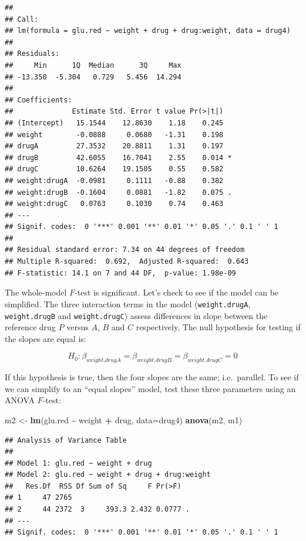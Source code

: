 \documentclass[
]{book}
\newenvironment{Shaded}{\begin{snugshade}}{\end{snugshade}}
\newcommand{\AttributeTok}[1]{\textcolor[rgb]{0.13,0.29,0.53}{#1}}
\newcommand{\FunctionTok}[1]{\textcolor[rgb]{0.13,0.29,0.53}{\textbf{#1}}}
\newcommand{\NormalTok}[1]{#1}
\newcommand{\OtherTok}[1]{\textcolor[rgb]{0.56,0.35,0.01}{#1}}
\newcommand{\SpecialCharTok}[1]{\textcolor[rgb]{0.81,0.36,0.00}{\textbf{#1}}}
\begin{document}
\begin{verbatim}
## 
## Call:
## lm(formula = glu.red ~ weight + drug + drug:weight, data = drug4)
## 
## Residuals:
##     Min      1Q  Median      3Q     Max 
## -13.350  -5.304   0.729   5.456  14.294 
## 
## Coefficients:
##              Estimate Std. Error t value Pr(>|t|)  
## (Intercept)   15.1544    12.8630    1.18    0.245  
## weight        -0.0888     0.0680   -1.31    0.198  
## drugA         27.3532    20.8811    1.31    0.197  
## drugB         42.6055    16.7041    2.55    0.014 *
## drugC         10.6264    19.1505    0.55    0.582  
## weight:drugA  -0.0981     0.1111   -0.88    0.382  
## weight:drugB  -0.1604     0.0881   -1.82    0.075 .
## weight:drugC   0.0763     0.1030    0.74    0.463  
## ---
## Signif. codes:  0 '***' 0.001 '**' 0.01 '*' 0.05 '.' 0.1 ' ' 1
## 
## Residual standard error: 7.34 on 44 degrees of freedom
## Multiple R-squared:  0.692,  Adjusted R-squared:  0.643 
## F-statistic: 14.1 on 7 and 44 DF,  p-value: 1.98e-09
\end{verbatim}

The whole-model \(F\)-test is significant. Let's check to see if the model can be simplified. The three interaction terms in the model (\texttt{weight.drugA}, \texttt{weight.drugB} and \texttt{weight.drugC}) assess differences in slope between the reference drug \(P\) versus \(A\), \(B\) and \(C\) respectively. The null hypothesis for testing if the slopes are equal is:

\[H_0: \beta_{weight.drugA} = \beta_{weight.drugB} = \beta_{weight.drugC} = 0\]

If this hypothesis is true, then the four slopes are the same; i.e.~parallel. To see if we can simplify to an ``equal slopes'' model, test these three parameters using an ANOVA \(F\)-test:

\begin{Shaded}
\begin{Highlighting}[]
\NormalTok{m2 }\OtherTok{\textless{}{-}} \FunctionTok{lm}\NormalTok{(glu.red }\SpecialCharTok{\textasciitilde{}}\NormalTok{ weight }\SpecialCharTok{+}\NormalTok{ drug, }\AttributeTok{data=}\NormalTok{drug4)}
\FunctionTok{anova}\NormalTok{(m2, m1)}
\end{Highlighting}
\end{Shaded}

\begin{verbatim}
## Analysis of Variance Table
## 
## Model 1: glu.red ~ weight + drug
## Model 2: glu.red ~ weight + drug + drug:weight
##   Res.Df  RSS Df Sum of Sq     F Pr(>F)  
## 1     47 2765                            
## 2     44 2372  3     393.3 2.432 0.0777 .
## ---
## Signif. codes:  0 '***' 0.001 '**' 0.01 '*' 0.05 '.' 0.1 ' ' 1
\end{verbatim}
\end{document}
